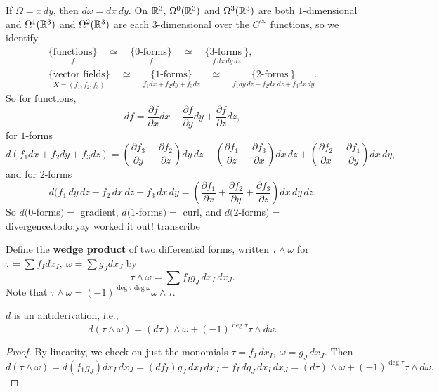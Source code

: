 \begin{example}
    If $\Omega=x\, dy$, then $d\omega=dx\,dy$. On $\mathbb{R}^3$, $\Omega^0(\mathbb{R}^3)$ and $\Omega^3(\mathbb{R}^3)$ are both $1$-dimensional and $\Omega^1(\mathbb{R}^3)$ and $\Omega^2(\mathbb{R}^3)$ are each $3$-dimensional over the $C^{\infty}$ functions, so we identify 
    \begin{gather*}
   \underset{f}{ \{\text{functions} \} } \quad \simeq \quad \underset{f}{\{0\text{-forms} \}}  \quad \simeq \quad \underset{f\,dx\,dy\,dz}{\{3\text{-forms} \ \} 
}  ,   \\
\underset{X=(f_1,f_2,f_3)}{ \{\text{vector fields} \} } \quad \simeq \quad \underset{f_1dx+f_2dy+f_3dz}{\{1\text{-forms} \}}  \quad \simeq \quad \underset{f_1dy\,dz-f_2dx\,dz+f_3dx\,dy}{\{2\text{-forms} \ \} 
}  .
    \end{gather*}So for functions, \[
    df= \frac{\partial f}{\partial x}dx+\frac{\partial f}{\partial y}dy+\frac{\partial f}{\partial z}dz,
    \] for $1$-forms \[
    d(f_1dx+f_2dy+f_3dz)=\left( \frac{\partial f_3}{\partial y}-\frac{\partial f_2}{\partial z} \right) dy\,dz-\left( \frac{\partial f_1}{\partial z}-\frac{\partial f_3}{\partial x} \right) dx\,dz+\left( \frac{\partial f_2}{\partial x}-\frac{\partial f_1}{\partial y} \right) dx\,dy,
    \] and for $2$-forms \[
    d(f_1\,dy\,dz-f_2\,dx\,dz+f_3\,dx\,dy=\left( \frac{\partial f_1}{\partial x}+\frac{\partial f_2}{\partial y}+\frac{\partial f_3}{\partial z} \right) dx\,dy\,dz.
\] So $d(0$-forms$)=$ gradient, $d(1$-forms$)=$ curl, and $d(2$-forms$)=$ divergence.{\color{red}todo:yay worked it out! transcribe} 
\end{example}
\begin{definition}[]
    Define the \textbf{wedge product} of two differential forms, written $\tau \wedge \omega$ for $\tau= \sum f_I dx_I,\ \omega=\sum g_J dx_J$ by \[
    \tau \wedge \omega=\sum f_I g_J \,dx_I \,dx_J.
\] Note that $\tau \wedge \omega=(-1)^{\deg \tau \deg \omega}\omega \wedge \tau$.
\end{definition}
\begin{prop}
    $d$ is an antiderivation, i.e., \[
        d(\tau \wedge \omega)=(d\tau )\wedge \omega +(-1)^{\deg \tau }\tau \wedge d\omega.
    \] 
\end{prop}
\begin{proof}
    By linearity, we check on just the monomials $\tau=f_I\,dx_I,\ \omega=g_J \,dx_J$. Then \[
        d(\tau \wedge \omega)=d(f_1g_J)dx_I\,dx_J=(df_I)g_J\, dx_I\,dx_J+f_I\,dg_J\,dx_I\,dx_J=(d\tau)\wedge \omega+(-1)^{\deg \tau}\tau \wedge d\omega.
    \] 
\end{proof}
